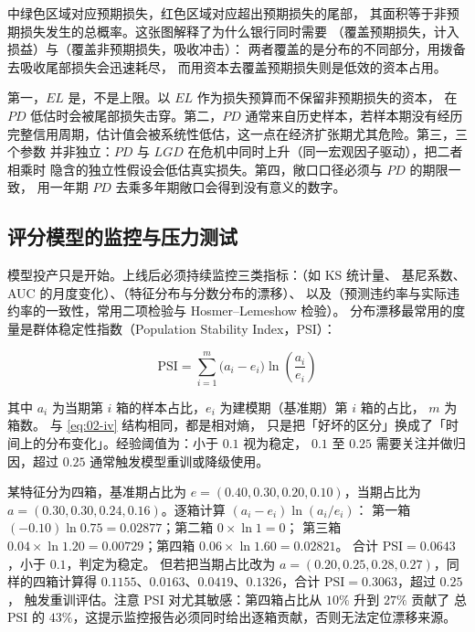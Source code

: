  中绿色区域对应预期损失，红色区域对应超出预期损失的尾部，
其面积等于非预期损失发生的总概率。这张图解释了为什么银行同时需要
（覆盖预期损失，计入损益）与（覆盖非预期损失，吸收冲击）：
两者覆盖的是分布的不同部分，用拨备去吸收尾部损失会迅速耗尽，
而用资本去覆盖预期损失则是低效的资本占用。

\begin{warningbox}[$EL$ 模型的失效条件]
第一，$EL$ 是，不是上限。以 $EL$ 作为损失预算而不保留非预期损失的资本，
在 $PD$ 低估时会被尾部损失击穿。第二，$PD$ 通常来自历史样本，若样本期没有经历
完整信用周期，估计值会被系统性低估，这一点在经济扩张期尤其危险。第三，三个参数
并非独立：$PD$ 与 $LGD$ 在危机中同时上升（同一宏观因子驱动），把二者相乘时
隐含的独立性假设会低估真实损失。第四，敞口口径必须与 $PD$ 的期限一致，
用一年期 $PD$ 去乘多年期敞口会得到没有意义的数字。
\end{warningbox}

\subsection{评分模型的监控与压力测试}

模型投产只是开始。上线后必须持续监控三类指标：（如 KS 统计量、
基尼系数、AUC 的月度变化）、（特征分布与分数分布的漂移）、
以及（预测违约率与实际违约率的一致性，常用二项检验与 Hosmer--Lemeshow 检验）。
分布漂移最常用的度量是群体稳定性指数（Population Stability Index，PSI）：

\begin{equation}\label{eq:02-psi}
  \mathrm{PSI} = \sum_{i=1}^{m}\bigl(a_i - e_i\bigr)\ln\!\left(\frac{a_i}{e_i}\right)
\end{equation}

其中 $a_i$ 为当期第 $i$ 箱的样本占比，$e_i$ 为建模期（基准期）第 $i$ 箱的占比，
$m$ 为箱数。 与 \cref{eq:02-iv} 结构相同，都是相对熵，
只是把「好坏的区分」换成了「时间上的分布变化」。经验阈值为：小于 $0.1$ 视为稳定，
$0.1$ 至 $0.25$ 需要关注并做归因，超过 $0.25$ 通常触发模型重训或降级使用。

\begin{example}\label{ex:02-psi}
某特征分为四箱，基准期占比为 $e = (0.40, 0.30, 0.20, 0.10)$，当期占比为
$a = (0.30, 0.30, 0.24, 0.16)$。逐箱计算 $(a_i - e_i)\ln(a_i/e_i)$：
第一箱 $(-0.10)\ln 0.75 = 0.02877$；第二箱 $0 \times \ln 1 = 0$；
第三箱 $0.04 \times \ln 1.20 = 0.00729$；第四箱 $0.06 \times \ln 1.60 = 0.02821$。
合计 $\mathrm{PSI} = 0.0643$，小于 $0.1$，判定为稳定。
但若把当期占比改为 $a = (0.20, 0.25, 0.28, 0.27)$，同样的四箱计算得
$0.1155$、$0.0163$、$0.0419$、$0.1326$，合计 $\mathrm{PSI} = 0.3063$，超过 $0.25$，
触发重训评估。注意 PSI 对尤其敏感：第四箱占比从 $10\%$ 升到 $27\%$ 贡献了
总 PSI 的 $43\%$，这提示监控报告必须同时给出逐箱贡献，否则无法定位漂移来源。
\end{example}

